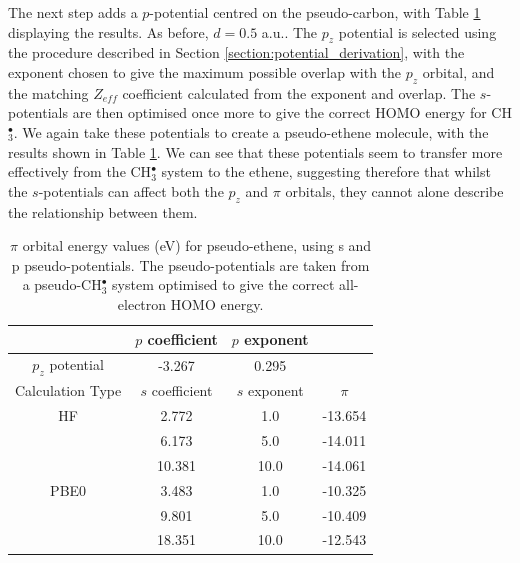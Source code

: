 \documentclass[journal=jctcce,manuscript=article]{achemso}
\begin{document}
The next step adds a \(p\)-potential centred on the pseudo-carbon, with Table \ref{table:p_potentials} displaying the results. As before, \(d = 0.5\) a.u.. The \(p_{z}\) potential is selected using the procedure described in Section \ref{section:potential_derivation}, with the exponent chosen to give the maximum possible overlap with the \(p_{z}\) orbital, and the matching \(Z_{eff}\) coefficient calculated from the exponent and overlap. The \(s\)-potentials are then optimised once more to give the correct HOMO energy for CH\(^{\bullet}_{3}\). We again take these potentials to create a pseudo-ethene molecule, with the results shown in Table \ref{table:p_potentials}. We can see that these potentials seem to transfer more effectively from the CH\(^{\bullet}_{3}\) system to the ethene, suggesting therefore that whilst the \(s\)-potentials can affect both the \(p_{z}\) and \(\pi\) orbitals, they 
cannot alone describe the relationship between them.

\begin{table}[ht]
\caption{\(\pi\) orbital energy values (eV) for pseudo-ethene, using s and p pseudo-potentials.
The pseudo-potentials are taken from a pseudo-CH\(^{\bullet}_{3}\) system optimised to give the correct all-electron HOMO energy.}
\begin{tabular}{c c c c}
\hline
& \(p\) coefficient & \(p\) exponent \\
\hline
\(p_{z}\) potential & -3.267 & 0.295 \\
\hline
Calculation Type & \(s\) coefficient & \(s\) exponent & \(\pi\) \\
\hline
HF & 2.772 & 1.0 & -13.654 \\
 & 6.173 & 5.0 & -14.011 \\
 & 10.381 & 10.0 & -14.061 \\
\hline
PBE0 & 3.483 & 1.0 & -10.325 \\
 & 9.801 & 5.0 & -10.409 \\
 & 18.351 & 10.0 & -12.543 \\
\hline
\end{tabular}
\label{table:p_potentials}
\end{table}
\end{document}

